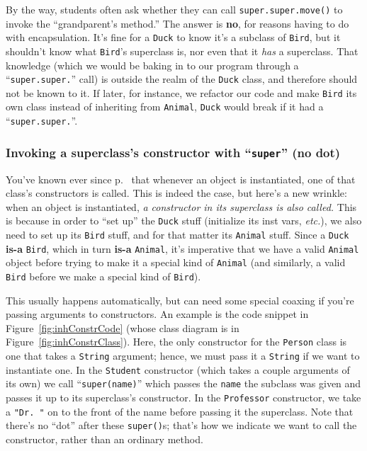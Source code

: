By the way, students often ask whether they can call
\texttt{super.super.move()} to invoke the ``grandparent's method.'' The answer
is \textbf{no}, for reasons having to do with encapsulation. It's fine for a
\texttt{Duck} to know it's a subclass of \texttt{Bird}, but it shouldn't know
what \texttt{Bird}'s superclass is, nor even that it \textit{has} a
superclass. That knowledge (which we would be baking in to our program through
a ``\texttt{super.super.}'' call) is outside the realm of the \texttt{Duck}
class, and therefore should not be known to it. If later, for instance, we
refactor our code and make \texttt{Bird} its own class instead of inheriting
from \texttt{Animal}, \texttt{Duck} would break if it had a
``\texttt{super.super.}''.

\subsubsection{Invoking a superclass's constructor with ``\texttt{super}'' (no
dot)}

You've known ever since p.~\pageref{page:instantiateConstructor} that whenever
an object is instantiated, one of that class's constructors is called. This is
indeed the case, but here's a new wrinkle: when an object is instantiated,
\textit{a constructor in its superclass is also called.} This is because in
order to ``set up'' the \texttt{Duck} stuff (initialize its inst vars,
\textit{etc.}), we also need to set up its \texttt{Bird} stuff, and for that
matter its \texttt{Animal} stuff. Since a \texttt{Duck} \textbf{is-a}
\texttt{Bird}, which in turn \textbf{is-a} \texttt{Animal}, it's imperative
that we have a valid \texttt{Animal} object before trying to make it a
special kind of \texttt{Animal} (and similarly, a valid \texttt{Bird} before
we make a special kind of \texttt{Bird}).

This usually happens automatically, but can need some special coaxing if
you're passing arguments to constructors. An example is the code snippet in
Figure~\ref{fig:inhConstrCode} (whose class diagram is in
Figure~\ref{fig:inhConstrClass}). Here, the only constructor for the
\texttt{Person} class is one that takes a \texttt{String} argument; hence, we
must pass it a \texttt{String} if we want to instantiate one. In the
\texttt{Student} constructor (which takes a couple arguments of its own) we
call ``\texttt{super(name)}'' which passes the \texttt{name} the subclass was
given and passes it up to its superclass's constructor. In the
\texttt{Professor} constructor, we take a \texttt{"Dr. "} on to the front of
the name before passing it the superclass. Note that there's no ``dot'' after
these \texttt{super()}s; that's how we indicate we want to call the
constructor, rather than an ordinary method.

